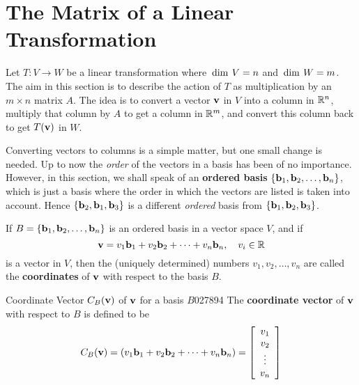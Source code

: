 \section{The Matrix of a Linear Transformation}
\label{sec:9_1}

Let $T : V \to W$ be a linear transformation where $\thinspace\operatorname{dim \medspace}V = n$ and $\thinspace\operatorname{dim \medspace}W = m$. The aim in this section is to describe the action of $T$ as multiplication by an $m \times n$ matrix $A$. The idea is to convert a vector $\textbf{v}$ in $V$ into a column in $\mathbb{R}^n$, multiply that column by $A$ to get a column in $\mathbb{R}^m$, and convert this column back to get $T(\textbf{v})$ in $W$.

Converting vectors to columns is a simple matter, but one small change is needed. Up to now the \textit{order} of the vectors in a basis has been of no importance. However, in this section, we shall speak of an \textbf{ordered basis} $\{\textbf{b}_{1}, \textbf{b}_{2}, \dots, \textbf{b}_{n}\}$, which is just a basis where the order in which the vectors are listed is taken into account. Hence $\{\textbf{b}_{2}, \textbf{b}_{1}, \textbf{b}_{3}\}$ is a different \textit{ordered} basis from $\{\textbf{b}_{1}, \textbf{b}_{2}, \textbf{b}_{3}\}$.


If $B = \{\textbf{b}_{1}, \textbf{b}_{2}, \dots, \textbf{b}_{n}\}$ is an ordered basis in a vector space $V$, and if
\begin{equation*}
  \textbf{v} = v_1\textbf{b}_1 + v_2\textbf{b}_2 + \cdots + v_n\textbf{b}_n, \quad v_i \in \mathbb{R} 
\end{equation*}
is a vector in $V$, then the (uniquely determined) numbers $v_{1}, v_{2}, \dots, v_{n}$ are called the \textbf{coordinates} of $\textbf{v}$ with respect to the basis $B$.


\begin{definition}{Coordinate Vector $C_B(\textbf{v})$ of $\textbf{v}$ for a basis $B$}{027894}
The \textbf{coordinate vector} of $\textbf{v}$ with respect to $B$ is defined to be
\begin{equation*}
C_B(\textbf{v})= (v_1\textbf{b}_1 + v_2\textbf{b}_2 + \cdots + v_n\textbf{b}_n) = \left[ \begin{array}{c} v_1 \\ v_2 \\ \vdots \\ v_n \end{array} \right]
\end{equation*}
\end{definition}

